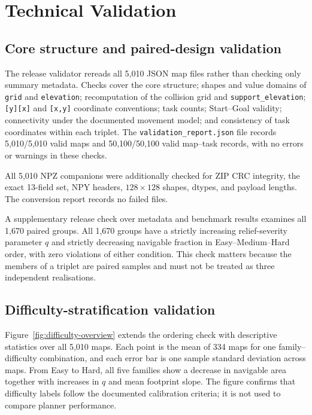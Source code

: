 \documentclass[11pt]{article}
\begin{document}
\section{Technical Validation}

\subsection{Core structure and paired-design validation}

The release validator rereads all 5,010 JSON map files rather than checking only
summary metadata. Checks cover the core structure; shapes and value domains of
\texttt{grid} and \texttt{elevation}; recomputation of the collision grid
and \texttt{support\_elevation}; \texttt{[y][x]} and \texttt{[x,y]}
coordinate conventions; task counts; Start--Goal validity; connectivity under
the documented movement model; and consistency of task coordinates within each
triplet. The \texttt{validation\_report.json} file records 5,010/5,010 valid
maps and 50,100/50,100 valid map--task records, with no errors or warnings in
these checks.

All 5,010 NPZ companions were additionally checked for ZIP CRC integrity,
the exact 13-field set, NPY headers, $128\times128$ shapes, dtypes, and payload
lengths. The conversion report records no failed files.

A supplementary release check over metadata and benchmark results examines all
1,670 paired groups. All 1,670 groups have a strictly increasing
relief-severity parameter $q$ and
strictly decreasing navigable fraction in Easy--Medium--Hard order, with zero
violations of either condition. This check matters because the members of a
triplet are paired samples and must not be treated as three independent
realisations.

\subsection{Difficulty-stratification validation}

Figure~\ref{fig:difficulty-overview} extends the ordering check with descriptive
statistics over all 5,010 maps. Each point is the mean of 334 maps for one
family--difficulty combination, and each error bar is one sample standard
deviation across maps. From Easy to Hard, all five families show a decrease in
navigable area together with increases in $q$ and mean footprint slope. The
figure confirms that difficulty labels follow the documented calibration
criteria; it is not used to compare planner performance.
\end{document}
